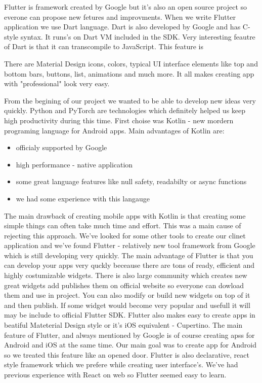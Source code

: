 \documentclass[../Main.tex]{subfiles}
\begin{document}
        Flutter is framework created by Google but it's also an open source project 
        so everone can propose new fetures and improvments. 
        When we write Flutter application we use Dart language.
        Dart is also developed by Google and has C-style syntax.
        It runs's on Dart VM included in the SDK. 
        Very interesting feautre of Dart is that it can transcompile to JavaScript.
        This feature is 
    
    There are Material Design 
        icons, colors, typical UI interface elements like top and bottom bars,
        buttons, list, animations and much more. 
        It all makes creating app with "professional" look very easy.
        
        
        From the begining of our project we wanted to be able to develop new ideas
        very quickly.
        Python and PyTorch are technologies which definitely helped us keep high
        productivity during this time. First choise was Kotlin - new mordern programing 
        language for Android apps. Main advantages of Kotlin are:
            \begin{itemize}
                \item officialy supported by Google
                \item high performance - native application
                \item some great language features like null safety, readabilty or async functions
                \item we had some experience with this langauge
            \end{itemize}
            
        The main drawback of creating mobile apps with Kotlin is that creating 
        some simple things can often take much time and effort. 
        This was a main cause of rejecting this approach.
        We've looked for some other tools to create our clinet application and 
        we've found Flutter - relatively new tool framework from Google which 
        is still developing very quickly.
        The main advantage of Flutter is that you can develop your apps very 
        quckly beceause there are tons of ready, efficient and highly costumizable 
        widgets. There is also large community which creates new great widgets 
        add publishes them on official website so everyone can dowload them and use in project.
        You can also modify or build new widgets on top of it and then publish.
        If some widget would become very popular and usefull it will may be 
        include to official Flutter SDK. 
        Flutter also makes easy to create apps in beatiful Mateterial Design 
        style or it's iOS equivalent - Cupertino. 
        The main feature of Flutter, and always mentioned by Google is of course 
        creating apss for Android and iOS at the same time. 
        Our main goal was to create app for Android so we treated this feature like 
        an opened door. 
        Flutter is also declarative, react style framework which we prefere while
        creating user interface's. We've had previous experience with React on web
        so Flutter seemed easy to learn.  
        



\biblio %
\end{document}
